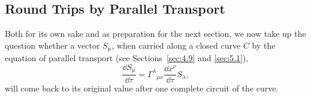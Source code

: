 
\subsection{Round Trips by Parallel Transport}\label{sec:6.3}

Both for its own sake and as preparation for the next section, we now take up
the question whether a vector \(S_\mu\), when carried along a closed curve
\(C\) by the equation of parallel transport (see Sections~\ref{sec:4.9} and
\ref{sec:5.1}),
\begin{equation}
  \frac{\dd S_\mu}{\dd\tau}
  =
  \Gamma^\lambda{}_{\mu\nu}
  \frac{\dd x^\nu}{\dd\tau}S_\lambda,
  \tag{6.3.1}\label{eq:6.3.1}
\end{equation}
will come back to its original value after one complete circuit of the curve.

